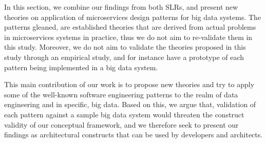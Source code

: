 \documentclass[conference]{IEEEtran}
\begin{document}
In this section, we combine our findings from both SLRs, and present new theories on application of microservices design patterns for big data systems. The patterns gleaned, are established theories that are derived from actual problems in microservices systems in practice, thus we do not aim to re-validate them in this study. Moreover, we do not aim to validate the theories proposed in this study through an empirical study, and for instance have a prototype of each pattern being implemented in a big data system. 

This main contribution of our work is to propose new theories and try to apply some of the well-known software engineering patterns to the realm of data engineering and in specific, big data. Based on this, we argue that, validation of each pattern against a sample big data system would threaten the construct validity of our conceptual framework, and we therefore seek to present our findings as architectural constructs that can be used by developers and architects. 


    


\end{document}
